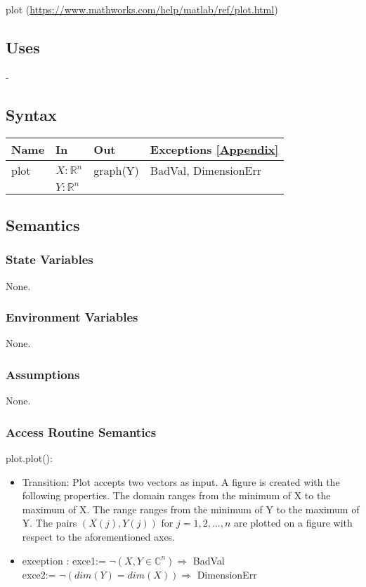 \documentclass[12pt, titlepage]{article}
\begin{document}
plot (\url{https://www.mathworks.com/help/matlab/ref/plot.html})

\subsection{Uses}

-

\subsection{Syntax}

\begin{center}
	\begin{tabular}{p{2cm} p{4cm} p{4cm} p{5cm}}
		\hline
		\textbf{Name} & \textbf{In} & \textbf{Out} & \textbf{Exceptions} 
		\ref{Appendix} \\
		\hline
		plot & $X : \mathbb{R}^{n}$ & graph(Y) & 
		BadVal, DimensionErr \\ 
		& $Y : \mathbb{R}^{n}$ &  &  \\ 
		\hline
	\end{tabular}
\end{center}

\subsection{Semantics}

\subsubsection{State Variables}

None.

\subsubsection{Environment Variables}

None.

\subsubsection{Assumptions}

None.

\subsubsection{Access Routine Semantics}

\noindent plot.plot():
\begin{itemize}
	\item Transition: Plot accepts two vectors as input. A figure is created 
	with the following properties. The domain ranges from the minimum of X to 
	the maximum of X. The range ranges from the minimum of Y to the maximum of 
	Y. The pairs $(X(j),Y(j))$ for $j=1,2,...,n$ are plotted on a figure with 
	respect to the aforementioned axes. 
	\item exception : exce1:= $\neg(X,Y \in \mathbb{C}^{n}) \Rightarrow$ 
	BadVal \\
	exce2:= $\neg (dim(Y) = dim(X)) \Rightarrow$ DimensionErr \\
\end{itemize}
\end{document}
